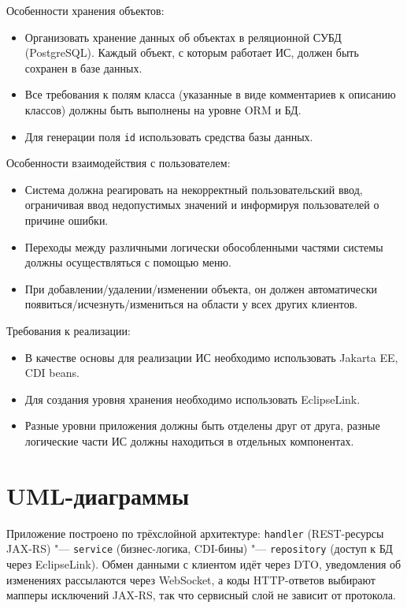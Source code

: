 \documentclass[12pt,a4paper]{article}
\begin{document}
Особенности хранения объектов:
\begin{itemize}
    \item Организовать хранение данных об объектах в реляционной СУБД (PostgreSQL). Каждый объект, с которым работает ИС, должен быть сохранен в базе данных.
    \item Все требования к полям класса (указанные в виде комментариев к описанию классов) должны быть выполнены на уровне ORM и БД.
    \item Для генерации поля \texttt{id} использовать средства базы данных.
\end{itemize}

Особенности взаимодействия с пользователем:
\begin{itemize}
    \item Система должна реагировать на некорректный пользовательский ввод, ограничивая ввод недопустимых значений и информируя пользователей о причине ошибки.
    \item Переходы между различными логически обособленными частями системы должны осуществляться с помощью меню.
    \item При добавлении/удалении/изменении объекта, он должен автоматически появиться/\allowbreak исчезнуть/\allowbreak измениться на области у всех других клиентов.
\end{itemize}

Требования к реализации:
\begin{itemize}
    \item В качестве основы для реализации ИС необходимо использовать Jakarta EE, CDI beans.
    \item Для создания уровня хранения необходимо использовать EclipseLink.
    \item Разные уровни приложения должны быть отделены друг от друга, разные логические части ИС должны находиться в отдельных компонентах.
\end{itemize}

\section{UML-диаграммы}

Приложение построено по трёхслойной архитектуре: \texttt{handler} (REST-ресурсы JAX-RS) "--- \texttt{service} (бизнес-логика, CDI-бины) "--- \texttt{repository} (доступ к БД через EclipseLink). Обмен данными с клиентом идёт через DTO, уведомления об изменениях рассылаются через WebSocket, а коды HTTP-ответов выбирают мапперы исключений JAX-RS, так что сервисный слой не зависит от протокола.
\end{document}
